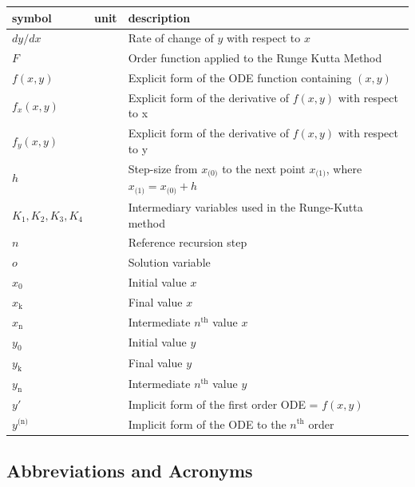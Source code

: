 \documentclass[12pt]{article}
\begin{document}
\renewcommand{\arraystretch}{1.2}
\noindent \begin{longtable*}{l l p{12cm}} \toprule
\textbf{symbol} & \textbf{unit} & \textbf{description}\\
\midrule
$dy/dx$ & \text {-} & Rate of change of $y$ with respect to $x$\\
$F$ & \text {-} & Order function applied to the Runge Kutta Method\\
$f(x, y)$ & \text{-} & Explicit form of the ODE function containing $(x,y)$\\
$f_{x}(x, y)$ & \text{-} & Explicit form of the derivative of $f(x, y)$ with respect to x\\
$f_{y}(x, y)$ & \text{-} & Explicit form of the derivative of $f(x, y)$ with respect to y\\
$h$ & \text{-} & Step-size from $x_\text{(0)}$ to the next point $x_\text{(1)}$, where $x_\text{(1)} = x_\text{(0)} + h$\\
$K_1, K_2, K_3, K_4$ & \text{-} & Intermediary variables used in the Runge-Kutta method\\
$n$ & \text{-} & Reference recursion step\\
$o$ & \text{-} & Solution variable\\
$x_\text{0}$ & \text{-} & Initial value $x$\\
$x_\text{k}$ & \text{-} & Final value $x$\\
$x_\text{n}$ & \text{-} & Intermediate $n^\text{th}$ value $x$\\
$y_\text{0}$ & \text{-} & Initial value $y$\\ 
$y_\text{k}$ & \text{-} & Final value $y$\\
$y_\text{n}$ & \text{-} & Intermediate $n^\text{th}$ value $y$\\ 
$y'$ & \text{-} & Implicit form of the first order ODE = $f(x, y)$\\
$y^\text{(n)}$ & \text{-} & Implicit form of the ODE to the $n^\text{th}$ order\\
\bottomrule
\end{longtable*}

\subsection{Abbreviations and Acronyms}
\end{document}
